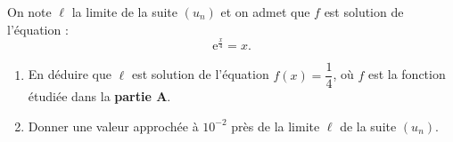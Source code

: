 On note $\ell$ la limite de la suite $\left(u_n\right)$ et on admet que $f$ est solution de l'équation : \[\text{e}^{\frac{x}{4}} = x.\]
%
\begin{enumerate}[resume]
	\item En déduire que $\ell$ est solution de l'équation $f(x) = \dfrac14$, où $f$ est la fonction étudiée dans
	la \textbf{partie A}.
	\item Donner une valeur approchée à $10^{-2}$ près de la limite $\ell$ de la suite $\left(u_n\right)$.
\end{enumerate}

